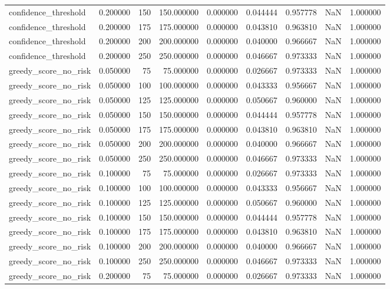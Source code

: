 \begin{tabular}{lrrrrrrrr}
confidence_threshold & 0.200000 & 150 & 150.000000 & 0.000000 & 0.044444 & 0.957778 & NaN & 1.000000 \\
confidence_threshold & 0.200000 & 175 & 175.000000 & 0.000000 & 0.043810 & 0.963810 & NaN & 1.000000 \\
confidence_threshold & 0.200000 & 200 & 200.000000 & 0.000000 & 0.040000 & 0.966667 & NaN & 1.000000 \\
confidence_threshold & 0.200000 & 250 & 250.000000 & 0.000000 & 0.046667 & 0.973333 & NaN & 1.000000 \\
greedy_score_no_risk & 0.050000 & 75 & 75.000000 & 0.000000 & 0.026667 & 0.973333 & NaN & 1.000000 \\
greedy_score_no_risk & 0.050000 & 100 & 100.000000 & 0.000000 & 0.043333 & 0.956667 & NaN & 1.000000 \\
greedy_score_no_risk & 0.050000 & 125 & 125.000000 & 0.000000 & 0.050667 & 0.960000 & NaN & 1.000000 \\
greedy_score_no_risk & 0.050000 & 150 & 150.000000 & 0.000000 & 0.044444 & 0.957778 & NaN & 1.000000 \\
greedy_score_no_risk & 0.050000 & 175 & 175.000000 & 0.000000 & 0.043810 & 0.963810 & NaN & 1.000000 \\
greedy_score_no_risk & 0.050000 & 200 & 200.000000 & 0.000000 & 0.040000 & 0.966667 & NaN & 1.000000 \\
greedy_score_no_risk & 0.050000 & 250 & 250.000000 & 0.000000 & 0.046667 & 0.973333 & NaN & 1.000000 \\
greedy_score_no_risk & 0.100000 & 75 & 75.000000 & 0.000000 & 0.026667 & 0.973333 & NaN & 1.000000 \\
greedy_score_no_risk & 0.100000 & 100 & 100.000000 & 0.000000 & 0.043333 & 0.956667 & NaN & 1.000000 \\
greedy_score_no_risk & 0.100000 & 125 & 125.000000 & 0.000000 & 0.050667 & 0.960000 & NaN & 1.000000 \\
greedy_score_no_risk & 0.100000 & 150 & 150.000000 & 0.000000 & 0.044444 & 0.957778 & NaN & 1.000000 \\
greedy_score_no_risk & 0.100000 & 175 & 175.000000 & 0.000000 & 0.043810 & 0.963810 & NaN & 1.000000 \\
greedy_score_no_risk & 0.100000 & 200 & 200.000000 & 0.000000 & 0.040000 & 0.966667 & NaN & 1.000000 \\
greedy_score_no_risk & 0.100000 & 250 & 250.000000 & 0.000000 & 0.046667 & 0.973333 & NaN & 1.000000 \\
greedy_score_no_risk & 0.200000 & 75 & 75.000000 & 0.000000 & 0.026667 & 0.973333 & NaN & 1.000000 \\

\end{tabular}
